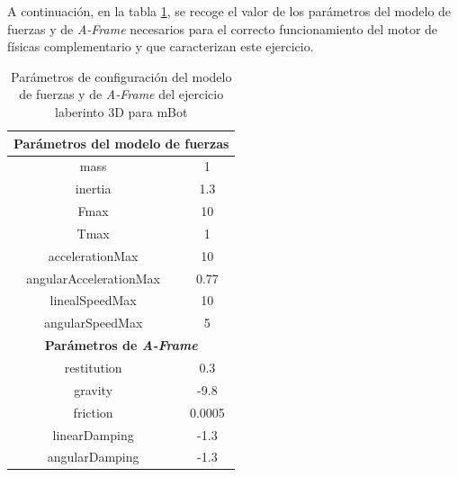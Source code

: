\clearpage

A continuación, en la tabla \ref{tabla:param_ej2}, se recoge el valor de los parámetros del modelo de fuerzas y de  \textit{A-Frame} necesarios para el correcto funcionamiento del motor de físicas complementario y que caracterizan este ejercicio.

\begin{table}[h!]
\centering
\begin{tabular}{|c|c|}
\hline
\multicolumn{2}{|c|}{\textbf{Parámetros del modelo de fuerzas}}                \\ \hline
mass                                           & 1                             \\ \hline
inertia                                        & 1.3                           \\ \hline
Fmax                                           & 10                            \\ \hline
Tmax                                           & 1                             \\ \hline
accelerationMax                                & 10                            \\ \hline
angularAccelerationMax                         & 0.77                          \\ \hline
linealSpeedMax                                 & 10                            \\ \hline
angularSpeedMax                                & 5                             \\ \hline
\multicolumn{2}{|c|}{\textbf{Parámetros de \textit{A-Frame}}} \\ \hline
restitution                                    & 0.3                           \\ \hline
gravity                                        & -9.8                          \\ \hline
friction                                       &  0.0005                       \\ \hline
linearDamping                                  & -1.3                          \\ \hline
angularDamping                                 & -1.3                          \\ \hline
\end{tabular}
\caption{Parámetros de configuración del modelo de fuerzas y de \textit{A-Frame} del ejercicio laberinto 3D para mBot}
\label{tabla:param_ej2}
\end{table}

